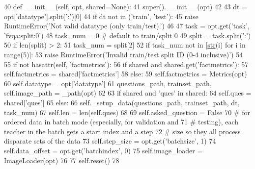 \begin{DoxyCode}
40     \textcolor{keyword}{def }\_\_init\_\_(self, opt, shared=None):
41         super().\_\_init\_\_(opt)
42 
43         dt = opt[\textcolor{stringliteral}{'datatype'}].split(\textcolor{stringliteral}{':'})[0]
44         \textcolor{keywordflow}{if} dt \textcolor{keywordflow}{not} \textcolor{keywordflow}{in} (\textcolor{stringliteral}{'train'}, \textcolor{stringliteral}{'test'}):
45             \textcolor{keywordflow}{raise} RuntimeError(\textcolor{stringliteral}{'Not valid datatype (only train/test).'})
46 
47         task = opt.get(\textcolor{stringliteral}{'task'}, \textcolor{stringliteral}{'fvqa:split:0'})
48         task\_num = 0  \textcolor{comment}{# default to train/split 0}
49         split = task.split(\textcolor{stringliteral}{':'})
50         \textcolor{keywordflow}{if} len(split) > 2:
51             task\_num = split[2]
52             \textcolor{keywordflow}{if} task\_num \textcolor{keywordflow}{not} \textcolor{keywordflow}{in} [\hyperlink{namespacegenerate__task__READMEs_a5b88452ffb87b78c8c85ececebafc09f}{str}(i) \textcolor{keywordflow}{for} i \textcolor{keywordflow}{in} range(5)]:
53                 \textcolor{keywordflow}{raise} RuntimeError(\textcolor{stringliteral}{'Invalid train/test split ID (0-4 inclusive)'})
54 
55         \textcolor{keywordflow}{if} \textcolor{keywordflow}{not} hasattr(self, \textcolor{stringliteral}{'factmetrics'}):
56             \textcolor{keywordflow}{if} shared \textcolor{keywordflow}{and} shared.get(\textcolor{stringliteral}{'factmetrics'}):
57                 self.factmetrics = shared[\textcolor{stringliteral}{'factmetrics'}]
58             \textcolor{keywordflow}{else}:
59                 self.factmetrics = Metrics(opt)
60             self.datatype = opt[\textcolor{stringliteral}{'datatype'}]
61         questions\_path, trainset\_path, self.image\_path = \_path(opt)
62 
63         \textcolor{keywordflow}{if} shared \textcolor{keywordflow}{and} \textcolor{stringliteral}{'ques'} \textcolor{keywordflow}{in} shared:
64             self.ques = shared[\textcolor{stringliteral}{'ques'}]
65         \textcolor{keywordflow}{else}:
66             self.\_setup\_data(questions\_path, trainset\_path, dt, task\_num)
67         self.len = len(self.ques)
68 
69         self.asked\_question = \textcolor{keyword}{False}
70         \textcolor{comment}{# for ordered data in batch mode (especially, for validation and}
71         \textcolor{comment}{# testing), each teacher in the batch gets a start index and a step}
72         \textcolor{comment}{# size so they all process disparate sets of the data}
73         self.step\_size = opt.get(\textcolor{stringliteral}{'batchsize'}, 1)
74         self.data\_offset = opt.get(\textcolor{stringliteral}{'batchindex'}, 0)
75         self.image\_loader = ImageLoader(opt)
76 
77         self.reset()
78 
\end{DoxyCode}


